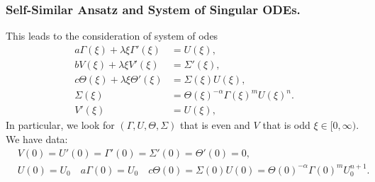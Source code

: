 \documentclass{beamer}
\begin{document}
\begin{frame}
 \frametitle{Self-Similar Ansatz and System of Singular ODEs.}
 This leads to the consideration of system of odes
\begin{equation} \label{intro:ss-odes}
\begin{aligned}
 a \Gamma(\xi) + \lambda \xi \Gamma'(\xi) &= U(\xi), \\
 b V(\xi) + \lambda \xi V'(\xi) &= \Sigma'(\xi), \\ 
 c \Theta(\xi) + \lambda \xi \Theta'(\xi)&=\Sigma(\xi) U(\xi),\\
 \Sigma(\xi) &= \Theta(\xi)^{-\alpha} \Gamma(\xi)^m U(\xi)^n. \\
 V'(\xi)&=U(\xi),
\end{aligned} 
\end{equation}
In particular, we look for $(\Gamma,U,\Theta,\Sigma)$ that is even and $V$ that is odd $\xi \in [0,\infty)$. We have %
% 
data:{\scriptsize
\begin{align*}
 &V(0)=U'(0)=\Gamma'(0)=\Sigma'(0)=\Theta'(0)=0,\\
&U(0) = U_0 \quad  a \Gamma (0) = U_0 \quad  c \Theta (0) = \Sigma (0) U(0) = \Theta (0)^{-\alpha} \Gamma (0)^m U_0^{n+1}.
\end{align*}}
\end{frame}
\end{document}

